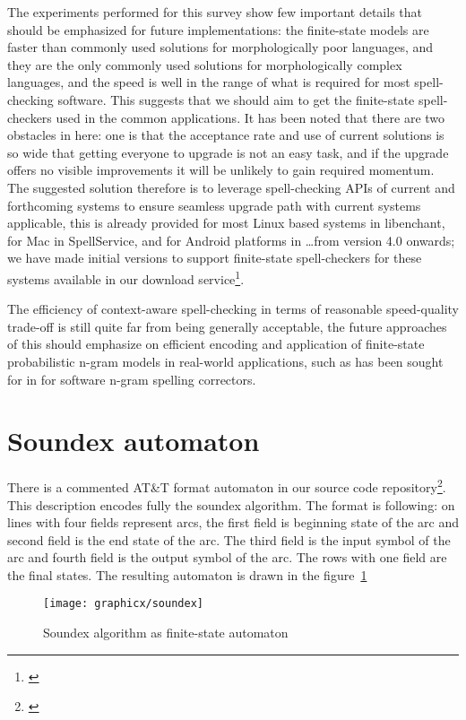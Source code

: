 \documentclass[a4paper,12pt]{article}
\begin{document}
The experiments performed for this survey show few important details that
should be emphasized for future implementations: the finite-state models are
faster than commonly used solutions for morphologically poor languages, and
they are the only commonly used solutions for morphologically complex
languages, and the speed is well in the range of what is required for most
spell-checking software. This suggests that we should aim to get the
finite-state spell-checkers used in the common applications. It has been noted
that there are two obstacles in here: one is that the acceptance rate and use
of current solutions is so wide that getting everyone to upgrade is not an
easy task, and if the upgrade offers no visible improvements it will be
unlikely to gain required momentum. The suggested solution therefore is to
leverage spell-checking APIs of current and forthcoming systems to ensure
seamless upgrade path with current systems applicable, this is already provided
for most Linux based systems in libenchant, for Mac in SpellService, and for
Android platforms in \ldots from version 4.0 onwards; we have made initial
versions to support finite-state spell-checkers for these systems available in
our download service\footnote{\url{}}.

The efficiency of context-aware spell-checking in terms of reasonable 
speed-quality trade-off is still quite far from being generally acceptable,
the future approaches of this should emphasize on efficient encoding and
application of finite-state probabilistic n-gram models in real-world
applications, such as has been sought for in \cite{} for software n-gram
spelling correctors.



\section*{Soundex automaton}
\label{appendix:soundex}

There is a commented AT\&T format automaton in our source code
repository\footnote{\url{}}. This description encodes fully the soundex
algorithm.  The format is following: on lines with four fields represent arcs,
the first field is beginning state of the arc and second field is the end state
of the arc. The third field is the input symbol of the arc and fourth field is
the output symbol of the arc. The rows with one field are the final states. The
resulting automaton is drawn in the figure~\ref{fig:soundex}

\begin{figure}
    \centering
    \texttt{[image: graphicx/soundex]}
    \caption{Soundex algorithm as finite-state automaton
    \label{fig:soundex}}
\end{figure}
\end{document}
